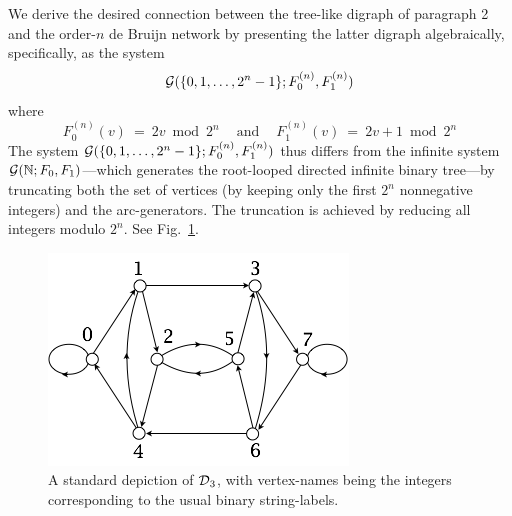 We derive the desired connection between the tree-like digraph of paragraph 2 and the order-$n$
de Bruijn network by presenting the latter digraph algebraically, specifically, as the system 
\[ \mbox{$\cal G$}(\{0, 1, \ldots, 2^n-1\}; F^{(n)}_0, F^{(n)}_1) \]
where
\[ F^{(n)}_0(v) \ = \ 2v \bmod 2^n \ \ \ \ \mbox{ and } \ \ \ \ F^{(n)}_1(v) \ = \ 2v +1 \bmod 2^n \]
The system $\mbox{$\cal G$}(\{0, 1, \ldots, 2^n-1\}; F^{(n)}_0, F^{(n)}_1)$ thus differs from the infinite system 
$\mbox{$\cal G$}(\mathbb{N}; F_0, F_1)$---which generates the root-looped directed infinite binary tree---by truncating
both the set of vertices (by keeping only the first $2^n$ nonnegative integers) and the arc-generators.  The truncation is achieved by reducing all integers modulo $2^n$.  See Fig.~\ref{fig:deBruijn}.
\begin{figure}[hbt]
\begin{center}
       \includegraphics[scale=0.5]{FiguresGraph/dB2by3numbers}
       \caption{A standard depiction of $\mbox{$\cal D$}_3$, with vertex-names being the integers corresponding to the usual binary string-labels.}
  \label{fig:deBruijn}
\end{center}
\end{figure}

\smallskip

